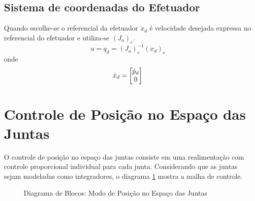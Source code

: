 \subsection{Sistema de coordenadas do Efetuador} \label{sec:openloopefct}
Quando escolhe-se o referencial da efetuador ${\dot{x}}_d$ é velocidade desejada expressa no referencial do efetuador e utiliza-se $({J}_{a})_e$.
\begin{equation}
{u} = {\dot{q}}_d = ({J}_{a})_e^{-1} ({\dot{x}}_d)_e
\end{equation}
onde 
\begin{equation}
{\dot{x}}_d = \begin{bmatrix}{\dot{p}}_d \\ 0\end{bmatrix}
\end{equation}

\section{Controle de Posição no Espaço das Juntas} \label{sec:position_joint}
O controle de posição no espaço das juntas consiste em uma realimentação com controle proporcional individual para cada junta. Considerando que as juntas sejam modeladas como integradores, o diagrama \ref{fig:pos_juntas} mostra a malha de controle.

\begin{figure}[h!]
\centering
{}
\caption{Diagrama de Blocos: Modo de Posição no Espaço das Juntas}
\label{fig:pos_juntas}
\end{figure}

